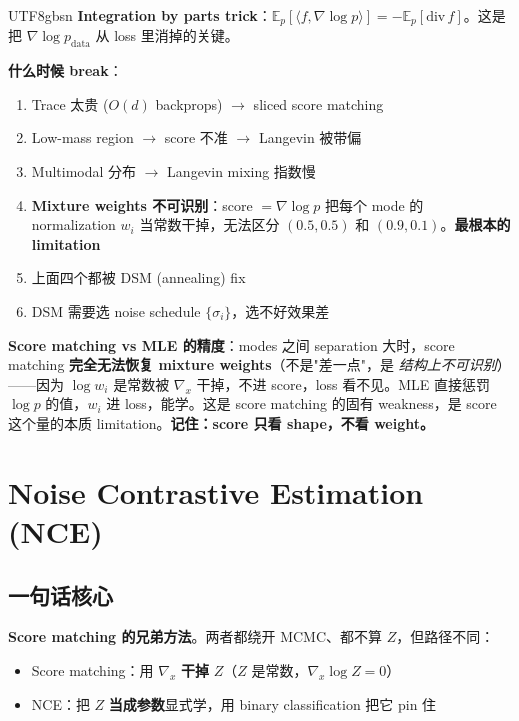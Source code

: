 \documentclass[11pt]{article}
\begin{document}
\begin{CJK}{UTF8}{gbsn}
\textbf{Integration by parts trick}：$\mathbb{E}_p[\langle f, \nabla \log p \rangle] = -\mathbb{E}_p[\text{div}\, f]$。这是把 $\nabla \log p_{\text{data}}$ 从 loss 里消掉的关键。

\textbf{什么时候 break}：
\begin{enumerate}[nosep]
  \item Trace 太贵 ($O(d)$ backprops) $\to$ sliced score matching
  \item Low-mass region $\to$ score 不准 $\to$ Langevin 被带偏
  \item Multimodal 分布 $\to$ Langevin mixing 指数慢
  \item \textbf{Mixture weights 不可识别}：score $= \nabla \log p$ 把每个 mode 的 normalization $w_i$ 当常数干掉，无法区分 $(0.5, 0.5)$ 和 $(0.9, 0.1)$。\textbf{最根本的 limitation}
  \item 上面四个都被 DSM (annealing) fix
  \item DSM 需要选 noise schedule $\{\sigma_i\}$，选不好效果差
\end{enumerate}

\textbf{Score matching vs MLE 的精度}：modes 之间 separation 大时，score matching \textbf{完全无法恢复 mixture weights}（不是"差一点"，是 \emph{结构上不可识别}）——因为 $\log w_i$ 是常数被 $\nabla_x$ 干掉，不进 score，loss 看不见。MLE 直接惩罚 $\log p$ 的值，$w_i$ 进 loss，能学。这是 score matching 的固有 weakness，是 score 这个量的本质 limitation。\textbf{记住：score 只看 shape，不看 weight。}

\section{Noise Contrastive Estimation (NCE)}

\subsection{一句话核心}

\textbf{Score matching 的兄弟方法}。两者都绕开 MCMC、都不算 $Z$，但路径不同：
\begin{itemize}[nosep]
  \item Score matching：用 $\nabla_x$ \textbf{干掉} $Z$（$Z$ 是常数，$\nabla_x \log Z = 0$）
  \item NCE：把 $Z$ \textbf{当成参数}显式学，用 binary classification 把它 pin 住
\end{itemize}


\end{CJK}
\end{document}
